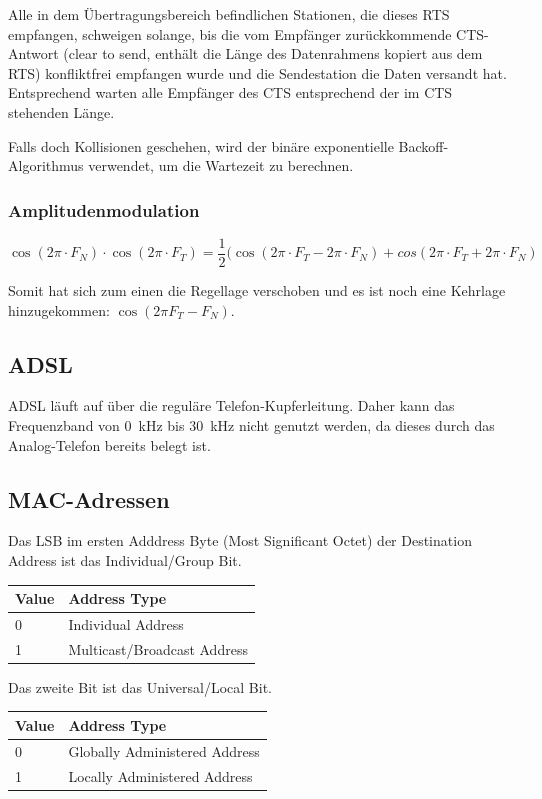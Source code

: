 Alle in dem Übertragungsbereich befindlichen Stationen, die dieses RTS
empfangen, schweigen solange, bis die vom Empfänger zurückkommende CTS-Antwort
(clear to send, enthält die Länge des Datenrahmens kopiert aus dem RTS)
konfliktfrei empfangen wurde und die Sendestation die Daten versandt hat.
Entsprechend warten alle Empfänger des CTS entsprechend der im CTS stehenden
Länge.

Falls doch Kollisionen geschehen, wird der binäre exponentielle
Backoff-Algorithmus verwendet, um die Wartezeit zu berechnen.

\subsubsection{Amplitudenmodulation}

\[
	\cos (2\pi \cdot F_N) \cdot \cos (2\pi \cdot F_T)
	= \frac{1}{2}(\cos (2\pi \cdot F_T - 2\pi \cdot F_N)
	+ cos(2\pi \cdot F_T + 2\pi \cdot F_N)
\]

Somit hat sich zum einen die Regellage verschoben und es ist noch eine Kehrlage
hinzugekommen: $\cos (2\pi F_T - F_N)$.


\subsection{ADSL}

ADSL läuft auf über die reguläre Telefon-Kupferleitung. Daher kann das
Frequenzband von 0~kHz bis 30~kHz nicht genutzt werden, da dieses durch das
Analog-Telefon bereits belegt ist.


\subsection{MAC-Adressen}

Das LSB im ersten Adddress Byte (Most Significant Octet) der Destination Address
ist das Individual/Group Bit.

\begin{tabular}[h]{|l|l|}
	\hline
  \textbf{Value} & \textbf{Address Type} \\
	\hline
  0 & Individual Address \\
  1 & Multicast/Broadcast Address \\
	\hline
\end{tabular}

Das zweite Bit ist das Universal/Local Bit.

\begin{tabular}[h]{|l|l|}
	\hline
  \textbf{Value} & \textbf{Address Type} \\
	\hline
  0 & Globally Administered Address \\
  1 & Locally Administered Address \\
	\hline
\end{tabular}


